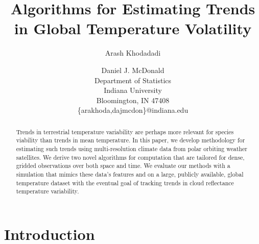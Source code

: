 \documentclass[letterpaper]{article} %
\begin{document}
 

\title{Algorithms for Estimating Trends in Global Temperature Volatility}

\author{Arash Khodadadi \and Daniel J. McDonald\\
 Department of Statistics\\
 Indiana University\\
 Bloomington, IN 47408 \\
 \{arakhoda,dajmcdon\}@indiana.edu}





\maketitle


\begin{abstract}
Trends in terrestrial temperature variability are perhaps more relevant for species
viability than trends in mean
temperature. In this paper, we develop methodology for estimating such
trends using multi-resolution climate data from polar orbiting weather
satellites. We derive two novel algorithms for computation that are
tailored for dense, gridded observations over both 
space and time. We evaluate our methods with a simulation that mimics these data's 
features and on a large, publicly available, global
temperature dataset with the eventual goal of tracking trends in
cloud reflectance temperature variability.
\end{abstract}



\section{Introduction}

\end{document}
